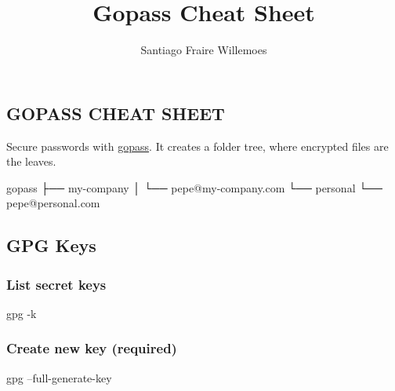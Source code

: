 \documentclass[9pt,english,a4paper,]{scrartcl}
\title{Gopass Cheat Sheet}
\author{Santiago Fraire Willemoes}
\date{}
\newenvironment{Shaded}{}{}
\newcommand{\ExtensionTok}[1]{#1}
\newcommand{\NormalTok}[1]{#1}
\begin{document}
\raggedright

\footnotesize

\begin{multicols}{3}
\hypertarget{gopass-cheat-sheet}{%
\section{GOPASS CHEAT SHEET}\label{gopass-cheat-sheet}}

Secure passwords with \href{https://gopass.pw}{gopass}. It creates a
folder tree, where encrypted files are the leaves.

\begin{Shaded}
\begin{Highlighting}[]
\ExtensionTok{gopass}
\NormalTok{├── }\ExtensionTok{my-company}
\NormalTok{│   └── }\ExtensionTok{pepe@my-company.com}
\NormalTok{└── }\ExtensionTok{personal}
\NormalTok{    └── }\ExtensionTok{pepe@personal.com}
\end{Highlighting}
\end{Shaded}

\hypertarget{gpg-keys}{%
\subsection{GPG Keys}\label{gpg-keys}}

\hypertarget{list-secret-keys}{%
\subsubsection{List secret keys}\label{list-secret-keys}}

\begin{Shaded}
\begin{Highlighting}[]
\ExtensionTok{gpg}\NormalTok{ -k}
\end{Highlighting}
\end{Shaded}

\hypertarget{create-new-key-required}{%
\subsubsection{Create new key
(required)}\label{create-new-key-required}}

\begin{Shaded}
\begin{Highlighting}[]
\ExtensionTok{gpg}\NormalTok{ --full-generate-key}
\end{Highlighting}
\end{Shaded}


\end{multicols}
\end{document}

